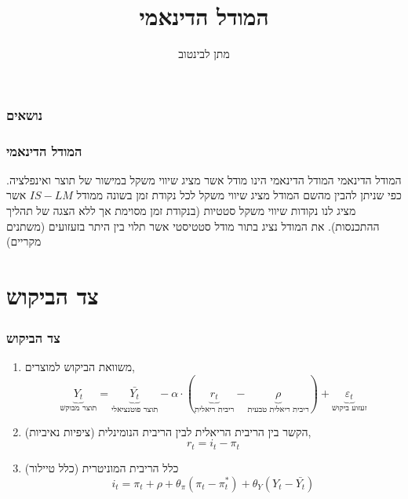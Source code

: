 \documentclass[usenames,dvipsnames]{beamer}
\title[]{המודל הדינאמי}
\author{מתן לבינטוב}
\institute[{{ אב"ג}}]{{ אוניברסיטת בן גוריון בנגב}}
\date{}
\begin{document}
\begin{RTL}
\begin{frame}
\titlepage
\end{frame}
\begin{frame}
    \frametitle{נושאים}
    \tableofcontents

    

\end{frame}

\begin{frame}
    \frametitle{המודל הדינאמי}
    \begin{block}{המודל הדינאמי}
        המודל הדינאמי הינו מודל אשר מציג שיווי משקל במישור של תוצר ואינפלציה. כפי שניתן להבין מהשם המודל מציג שיווי
משקל לכל נקודת זמן בשונה ממודל $IS-LM$ אשר מציג לנו נקודות שיווי משקל סטטיות (בנקודת זמן מסוימת אך ללא
הצגה של תהליך ההתכנסות). את המודל נציג בתור מודל סטטיסטי אשר תלוי בין היתר בזעזועים (משתנים מקריים)
    \end{block}

    

\end{frame}

\section{צד הביקוש}
\begin{frame}[allowframebreaks]
    \frametitle{צד הביקוש}
    \begin{enumerate}
        \item משוואת הביקוש למוצרים,
        $$\underbrace{Y_t}_{\text{תוצר מבוקש}} = \underbrace{\bar{Y_t}}_{\text{תוצר פוטנציאלי}} - \alpha \cdot (\underbrace{r_t}_{\text{ריבית ריאלית}} - \underbrace{\rho}_{\text{ריבית ריאלית טבעית}}) + \underbrace{\varepsilon_t }_{\text{זעזוע ביקוש}}$$
        \item הקשר בין הריבית הריאלית לבין הריבית הנומינלית (ציפיות נאיביות),
        $$r_t = i_t - \pi_t$$
        \item כלל הריבית המוניטרית (כלל טיילור)
        $$i_t = \pi_t + \rho +\theta_\pi \left(\pi_t - \pi^*_t\right) + \theta_Y \left(Y_t - \bar{Y_t}\right)$$
    \end{enumerate}
    

\end{frame}
\end{RTL}
\end{document}
